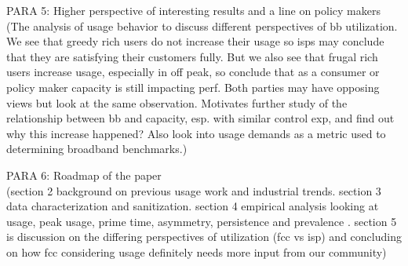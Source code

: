 PARA 5: Higher perspective of interesting results and a line on policy makers\\
(The analysis of usage behavior to discuss different perspectives of bb utilization. We see that greedy rich users do not increase their usage so isps may conclude that they are satisfying their customers fully. But we also see that frugal rich users increase usage, especially in off peak, so conclude that as a consumer or policy maker capacity is still impacting perf. Both parties may have opposing views but look at the same observation. Motivates further study of the relationship between bb and capacity, esp. with similar control exp, and find out why this increase happened? Also look into usage demands as a metric used to determining broadband benchmarks.)

PARA 6: Roadmap of the paper\\
(section 2 background on previous usage work and industrial trends. section 3 data characterization and sanitization. section 4 empirical analysis looking at usage, peak usage, prime time, asymmetry, persistence and prevalence . section 5 is discussion on the differing perspectives of utilization (fcc vs isp)  and concluding on how fcc considering usage definitely needs more input from our community)